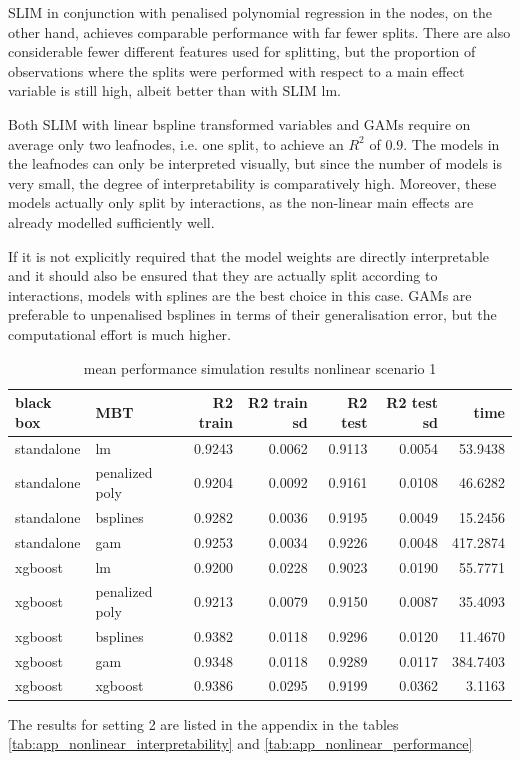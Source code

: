 SLIM in conjunction with penalised polynomial regression in the nodes, on the other hand, achieves comparable performance with far fewer splits.
There are also considerable fewer different features used for splitting, but the proportion of observations where the splits were performed with respect to a main effect variable is still high, albeit better than with SLIM lm.

Both SLIM with linear bspline transformed variables and GAMs require on average only two leafnodes, i.e. one split, to achieve an $R^2$ of $0.9$. The models in the leafnodes can only be interpreted visually, but since the number of models is very small, the degree of interpretability is comparatively high. Moreover, these models actually only split by interactions, as the non-linear main effects are already modelled sufficiently well. 

If it is not explicitly required that the model weights are directly interpretable and it should also be ensured that they are actually split according to interactions, models with splines are the best choice in this case. GAMs are preferable to unpenalised bsplines in terms of their generalisation error, but the computational effort is much higher.




\begin{table}[!htb]

\centering 
\begin{tabular}[t]{l|l|r|r|r|r|r}
\hline
black box & MBT & R2 train & R2 train sd & R2 test & R2 test sd & time\\
\hline
standalone & lm & 0.9243 & 0.0062 & 0.9113 & 0.0054 & 53.9438\\
standalone & penalized poly & 0.9204 & 0.0092 & 0.9161 & 0.0108 & 46.6282\\
standalone & bsplines & 0.9282 & 0.0036 & 0.9195 & 0.0049 & 15.2456\\
standalone & gam & 0.9253 & 0.0034 & 0.9226 & 0.0048 & 417.2874\\
\hline
xgboost & lm & 0.9200 & 0.0228 & 0.9023 & 0.0190 & 55.7771\\
xgboost & penalized poly & 0.9213 & 0.0079 & 0.9150 & 0.0087 & 35.4093\\
xgboost & bsplines & 0.9382 & 0.0118 & 0.9296 & 0.0120 & 11.4670\\
xgboost & gam & 0.9348 & 0.0118 & 0.9289 & 0.0117 & 384.7403\\
\hline
xgboost & xgboost & 0.9386 & 0.0295 & 0.9199 & 0.0362 & 3.1163\\
\hline
\end{tabular}
\caption{mean performance simulation results nonlinear scenario 1}

\end{table}








The results for setting 2 are listed in the appendix in the tables \ref{tab:app_nonlinear_interpretability} and \ref{tab:app_nonlinear_performance}






